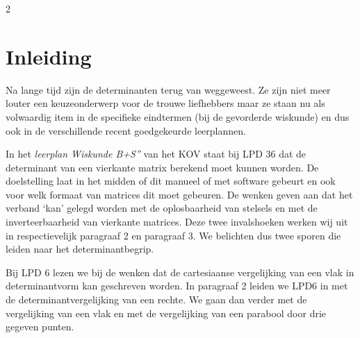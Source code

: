 
	

\startcontents[inhoudloep]	%

\begin{multicols}{2}
	
	\inhoudstafelloep			%
	
\section{Inleiding}

Na lange tijd zijn de determinanten terug van weggeweest. Ze zijn niet meer louter een keuzeonderwerp voor de trouwe liefhebbers maar ze staan nu als volwaardig item in de specifieke eindtermen (bij de gevorderde wiskunde) en dus ook in de verschillende recent goedgekeurde leerplannen. 

In het \emph{leerplan Wiskunde B+S''} van het KOV staat bij LPD 36 dat de determinant van een vierkante matrix berekend moet kunnen worden. De doelstelling laat in het midden of dit manueel of met software gebeurt en ook voor welk formaat van matrices dit moet gebeuren. De wenken geven aan dat het verband `kan' gelegd worden met de oplosbaarheid van stelsels en met de inverteerbaarheid van vierkante matrices. Deze twee invalshoeken werken wij uit in respectievelijk paragraaf 2 en paragraaf 3. We belichten dus twee sporen die leiden naar het determinantbegrip. 

Bij LPD 6 lezen we bij de wenken dat de cartesiaanse vergelijking van een vlak in determinantvorm kan geschreven worden. In paragraaf 2 leiden we LPD6 in met de determinantvergelijking van een rechte. We gaan dan verder met de vergelijking van een vlak en met de vergelijking van een parabool door drie gegeven punten.


\end{multicols}
